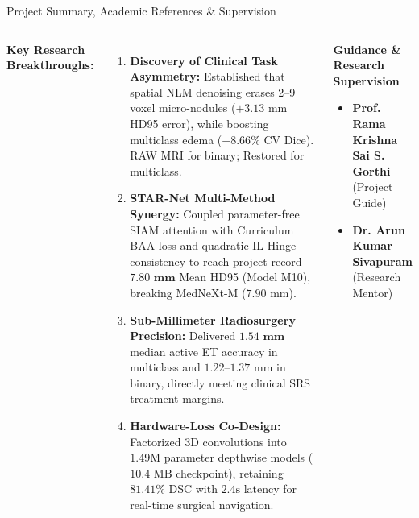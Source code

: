 \documentclass[aspectratio=169, 10pt]{beamer}
\begin{document}
\begin{frame}{Project Summary, Academic References \& Supervision}
  \begin{columns}[T]
    \textbf{Key Research Breakthroughs:}
    \begin{enumerate}\itemsep=5pt
      \scriptsize
      \item \textbf{Discovery of Clinical Task Asymmetry:} Established that spatial NLM denoising erases 2--9 voxel micro-nodules ($+3.13\text{ mm}$ HD95 error), while boosting multiclass edema ($+8.66\%$ CV Dice). RAW MRI for binary; Restored for multiclass.
      \item \textbf{STAR-Net Multi-Method Synergy:} Coupled parameter-free SIAM attention with Curriculum BAA loss and quadratic IL-Hinge consistency to reach project record $\mathbf{7.80\text{ mm}}$ Mean HD95 (Model M10), breaking MedNeXt-M ($7.90\text{ mm}$).
      \item \textbf{Sub-Millimeter Radiosurgery Precision:} Delivered $\mathbf{1.54\text{ mm}}$ median active ET accuracy in multiclass and $1.22$--$1.37\text{ mm}$ in binary, directly meeting clinical SRS treatment margins.
      \item \textbf{Hardware-Loss Co-Design:} Factorized 3D convolutions into $1.49\text{M}$ parameter depthwise models ($10.4\text{ MB}$ checkpoint), retaining $81.41\%$ DSC with $2.4\text{s}$ latency for real-time surgical navigation.
    \end{enumerate}

    \begin{block}{\textbf{Guidance \& Research Supervision}}
      \small
      \begin{itemize}\itemsep=4pt
        \item \textbf{Prof. Rama Krishna Sai S. Gorthi} (Project Guide)
        \item \textbf{Dr. Arun Kumar Sivapuram} (Research Mentor)
      \end{itemize}
    \end{block}


\end{columns}
\end{frame}
\end{document}
